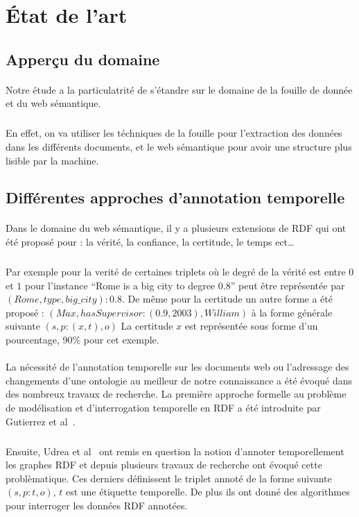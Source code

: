 \section*{État de l'art}
\subsection*{Apperçu du domaine}
\paragraph{}
Notre étude a la particulatrité de s'étandre sur le domaine de la fouille de donnée et du web sémantique.
\subparagraph{}
En effet, on va utiliser les téchniques de la fouille pour l'extraction des données dans les différents documents, et le web sémantique pour avoir une structure plus lisible par la machine.
\subsection*{Différentes approches d'annotation temporelle}			
\paragraph{}
Dans le domaine du web sémantique, il y a plusieurs extensions de RDF qui ont été proposé pour : la vérité, la confiance, la certitude, le temps ect…
\subparagraph{}
Par exemple pour la verité de certaines triplets où le degré de la vérité est entre $0$ et $1$
pour l’instance “Rome is a big city to degree 0.8” peut être représentée par $(Rome, type,big{\_}city) : 0.8$.
\newline
De même pour la certitude un autre forme a été proposé :
$(Max,hasSupervisor : (0.9,2003),William)$ à la forme générale suivante $(s, p : (x,t),o)$
\newline 
La certitude $x$ est représentée sous forme d'un pourcentage, 90\% pour cet exemple.
\paragraph{}
La nécessité de l’annotation temporelle sur les documents web ou l’adressage des changements d’une ontologie au meilleur de notre connaissance a été évoqué dans des nombreux travaux de recherche. La première approche formelle au problème de modélisation et d’interrogation temporelle en RDF a été introduite par Gutierrez et al~\cite{gutierrez2005}.
\subparagraph{}
Ensuite, Udrea et al~\cite{udrea2006} ont remis en question la notion d'annoter temporellement les graphes RDF et depuis plusieurs travaux de recherche ont évoqué cette problèmatique. 
Ces derniers définissent le triplet annoté de la forme suivante $(s,p:t,o)$, $t$ est une étiquette temporelle.
De plus ils ont donné des algorithmes pour interroger les données RDF annotées.

